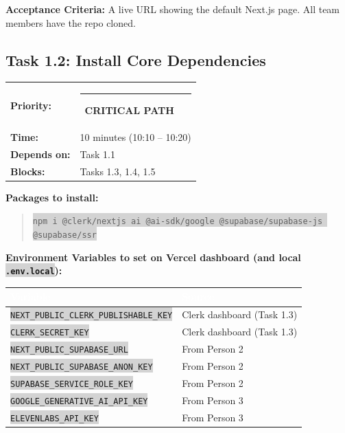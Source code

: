 \documentclass[11pt, a4paper]{article}
\newcommand{\critical}{\textcolor{critred}{\rule{6pt}{6pt}}~\textcolor{critred}{\scriptsize\textbf{CRITICAL PATH}}}
\newcommand{\code}[1]{\texttt{\small\colorbox{lightgray}{#1}}}
\begin{document}
\textbf{Acceptance Criteria:} A live URL showing the default Next.js page. All team members have the repo cloned.

\vspace{1em}

\subsection{Task 1.2: Install Core Dependencies}

\begin{tabularx}{\textwidth}{lX}
\textbf{Priority:} & \critical \\
\textbf{Time:} & 10 minutes (10:10 -- 10:20) \\
\textbf{Depends on:} & Task 1.1 \\
\textbf{Blocks:} & Tasks 1.3, 1.4, 1.5 \\
\end{tabularx}

\vspace{0.3em}

\textbf{Packages to install:}
\begin{quote}\code{npm i @clerk/nextjs ai @ai-sdk/google @supabase/supabase-js @supabase/ssr}\end{quote}

\textbf{Environment Variables to set on Vercel dashboard (and local \code{.env.local}):}

\begin{tabularx}{\textwidth}{|l|X|}
\hline
\rowcolor{primary}
\textcolor{white}{\textbf{Variable}} & \textcolor{white}{\textbf{Source}} \\
\hline
\code{NEXT\_PUBLIC\_CLERK\_PUBLISHABLE\_KEY} & Clerk dashboard (Task 1.3) \\
\hline
\code{CLERK\_SECRET\_KEY} & Clerk dashboard (Task 1.3) \\
\hline
\code{NEXT\_PUBLIC\_SUPABASE\_URL} & From Person 2 \\
\hline
\code{NEXT\_PUBLIC\_SUPABASE\_ANON\_KEY} & From Person 2 \\
\hline
\code{SUPABASE\_SERVICE\_ROLE\_KEY} & From Person 2 \\
\hline
\code{GOOGLE\_GENERATIVE\_AI\_API\_KEY} & From Person 3 \\
\hline
\code{ELEVENLABS\_API\_KEY} & From Person 3 \\
\hline
\end{tabularx}

\vspace{0.3em}
\end{document}
